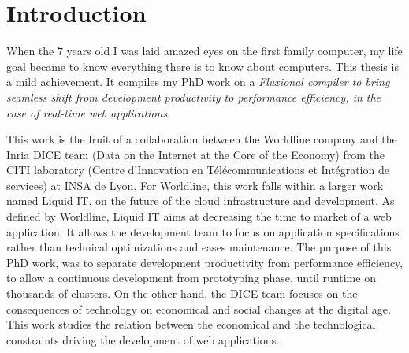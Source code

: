 \eject
\renewcommand{\glyph}{\linecons{\XeTeXglyph36}}%
\chapter{Introduction} \label{chapter:introduction}
\eject


When the 7 years old I was laid amazed eyes on the first family computer, my life goal became to know everything there is to know about computers.
This thesis is a mild achievement.
It compiles my PhD work on a
\textit{Fluxional compiler to bring seamless shift from development productivity to performance efficiency, in the case of real-time web applications}.


This work is the fruit of a collaboration between the Worldline company and the Inria DICE team (Data on the Internet at the Core of the Economy) from the CITI laboratory (Centre d’Innovation en Télécommunications et Intégration
de services) at INSA de Lyon.
For Worldline, this work falls within a larger work named Liquid IT, on the future of the cloud infrastructure and development.
As defined by Worldline, Liquid IT aims at decreasing the time to market of a web application.
It allows the development team to focus on application specifications rather than technical optimizations and eases maintenance.
The purpose of this PhD work, was to separate development productivity from performance efficiency, to allow a continuous development from prototyping phase, until runtime on thousands of clusters.
On the other hand, the DICE team focuses on the consequences of technology on economical and social changes at the digital age.
This work studies the relation between the economical and the technological constraints driving the development of web applications.

